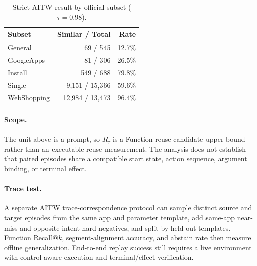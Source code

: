 \begin{table}[t]
  \centering
  \caption{Strict AITW result by official subset ($\tau=0.98$).}
  \label{tab:aitw-prompt-subsets}
  \small
  \begin{tabular}{lrr}
    \toprule
    Subset & Similar / Total & Rate \\
    \midrule
    General & 69 / 545 & 12.7\% \\
    GoogleApps & 81 / 306 & 26.5\% \\
    Install & 549 / 688 & 79.8\% \\
    Single & 9,151 / 15,366 & 59.6\% \\
    WebShopping & 12,984 / 13,473 & 96.4\% \\
    \bottomrule
  \end{tabular}
\end{table}

\paragraph{Scope.}
The unit above is a prompt, so $R_\tau$ is a Function-reuse candidate upper
bound rather than an executable-reuse measurement.  The analysis does not
establish that paired episodes share a compatible start state, action sequence,
argument binding, or terminal effect.

\paragraph{Trace test.}
A separate AITW trace-correspondence protocol can sample distinct source and
target episodes from the same app and
parameter template, add same-app near-miss and opposite-intent hard negatives,
and split by held-out templates.  Function Recall@$k$, segment-alignment
accuracy, and abstain rate then measure offline generalization.  End-to-end
replay success still requires a live environment with control-aware execution
and terminal/effect verification.

